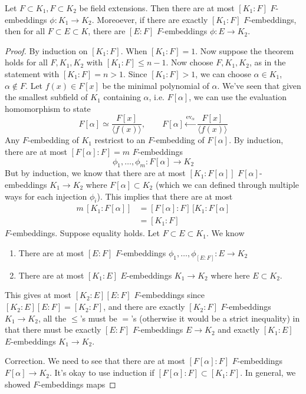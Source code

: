   \begin{theorem}
    Let $F \subset K_1, F \subset K_2$ be field extensions. Then there are at most $[K_1:F]$ $F$-embeddings $\phi: K_1 \to K_2$. Moreoever, if there are exactly $[K_1:F]$ $F$-embeddings, then for all $F \subset E \subset K$, there are $[E:F]$ $F$-embeddings $\phi: E \to K_2$. 
  \end{theorem}
  \begin{proof}
    By induction on $[K_1:F]$. When $[K_1:F] = 1$. Now suppose the theorem holds for all $F, K_1, K_2$ with $[K_1:F] \leq n-1$. Now choose $F, K_1, K_2$, as in the statement with $[K_1 : F] = n > 1$. Since $[K_1: F] > 1$, we can choose $\alpha \in K_1$, $\alpha \not\in F$. Let $f(x) \in F[x]$ be the minimal polynomial of $\alpha$. We've seen that given the smallest subfield of $K_1$ containing $\alpha$, i.e. $F[\alpha]$, we can use the evaluation homomorphism to state 
    \begin{equation}
      F[\alpha] \simeq \frac{F[x]}{\langle f(x)\rangle}, \qquad F[\alpha] \xleftarrow{\mathrm{ev}_\alpha} \frac{F[x]}{\langle f(x)\rangle} 
    \end{equation}
    Any $F$-embedding of $K_1$ restricst to an $F$-embedding of $F[\alpha]$. By induction, there are at most $[F[\alpha]: F] = m$ $F$-embeddings 
    \begin{equation}
      \phi_1, \ldots, \phi_m : F[\alpha] \to K_2
    \end{equation}
    But by induction, we know that there are at most $[K_1: F[\alpha]]$ $F[\alpha]$-embeddings $K_1 \to K_2$ where $F[\alpha] \subset K_2$ (which we can defined through multiple ways for each injection $\phi_i$). This implies that there are at most 
    \begin{align}
      m \, [K_1: F[\alpha]] & = [F[\alpha]: F]\, [K_1: F[\alpha] \\
                            & = [K_1 : F]
    \end{align}
    $F$-embeddings. Suppose equality holds. Let $F \subset E \subset K_1$. We know 
    \begin{enumerate}
      \item There are at most $[E:F]$ $F$-embeddings $\phi_1, \ldots, \phi_{[E:F]}: E \to K_2$ 
      \item There are at most $[K_1:E]$ $E$-embeddings $K_1 \to K_2$ where here $E \subset K_2$. 
    \end{enumerate}
    This gives at most $[K_2:E] [E:F]$ $F$-embeddings since $[K_2 :E] [E:F] = [K_2 :F]$, and there are exactly $[K_2 : F]$ $F$-embeddings $K_1 \to K_2$, all the $\leq$'s must be $=$'s (otherwise it would be a strict inequality) in that there must be exactly $[E:F]$ $F$-embeddings $E \to K_2$ and exactly $[K_1: E]$ $E$-embeddings $K_1 \to K_2$. 

    Correction. We need to see that there are at most $[F[\alpha]:F]$ $F$-embeddings $F[\alpha] \to K_2$. It's okay to use induction if $[F[\alpha]: F] \subset [K_1:F]$. In general, we showed $F$-embeddings maps 
  \end{proof}

